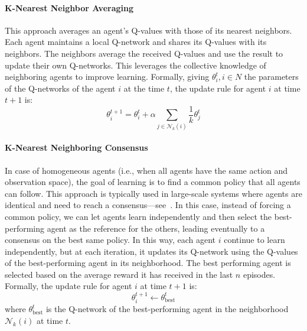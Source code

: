 \documentclass[sigconf]{acmart}
\begin{document}
\paragraph{K-Nearest Neighbor Averaging}
This approach averages an agent's Q-values with those of its nearest neighbors. 
Each agent maintains a local Q-network and shares its Q-values with its neighbors. 
The neighbors average the received Q-values and use the result to update their own Q-networks. 
This leverages the collective knowledge of neighboring agents to improve learning.
%
Formally, giving $\theta^t_i, i \in N$ the parameters of the Q-networks of the agent $i$ at the time $t$,
the update rule for agent $i$ at time $t+1$ is:
\begin{equation}
  \theta^{t+1}_i = \theta^t_i + \alpha \sum_{j \in \mathcal{N}_k(i)} \frac{1}{k} \theta^t_j
\end{equation}

\paragraph{K-Nearest Neighboring Consensus}
In case of homogeneous agents (i.e., when all agents have the same action and observation space),
the goal of learning is to find a common policy that all agents can follow.
This approach is typically used in large-scale systems where agents are identical and need to reach a consensus---see~\cite{DBLP:conf/eusipco/BaldazoPZ19}.
%
In this case, instead of forcing a common policy, we can let agents learn independently and then select the best-performing agent as the reference for the others, leading eventually to a consensus on the best same policy.
%
In this way, each agent $i$ continue to learn independently, but at each iteration, it updates its Q-network using the Q-values of the best-performing agent in its neighborhood.
%
The best performing agent is selected based on the average reward it has received in the last $n$ episodes.
Formally, the update rule for agent $i$ at time $t+1$ is:
\begin{equation}
  \theta^{t+1}_i \leftarrow \theta^t_{\text{best}}
\end{equation}
where $\theta^t_{\text{best}}$ is the Q-network of the best-performing agent in the neighborhood $\mathcal{N}_k(i)$ at time $t$.
\end{document}

